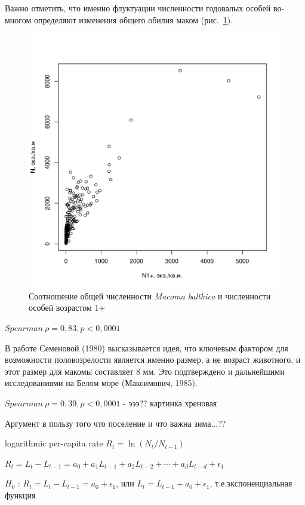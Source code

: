 Важно отметить, что именно флуктуации численности годовалых особей во-многом определяют изменения общего обилия маком (рис.~\ref{ris:N1year_vs_Nall}).
    \begin{figure}[hbp]
        \includegraphics[width=\textwidth]{../White_Sea/oneyear_all_Kandalaksha_all/N1y_vs_N2_1.pdf}
    \caption{Соотношение общей численности {\it Macoma balthica} и численности особей возрастом 1+}
    \label{ris:N1year_vs_Nall}
    \end{figure}

$Spearman\ \rho = 0,83, p < 0,0001$

В работе Семеновой (1980) высказывается идея, что ключевым фактором для возможности половозрелости является именно размер, а не возраст животного, и этот размер для макомы составляет 8 мм. Это подтверждено и дальнейшими исследованиями на Белом море (Максимович, 1985).

$Spearman\ \rho = 0,39, p < 0,0001$ - эээ?? картинка хреновая

Аргумент в пользу того что поселение и что важна зима...??
% 

logarithmic per-capita rate $R_{t} = \ln( N_{t}/N_{t-1})$ 

$R_{t}=L_{t}-L_{t-1}=a_{0} + a_{1}L_{t-1} + a_{2}L_{t-2} + \cdots + a_{d} L_{t-d} + \epsilon_{1}$

$H_{0}$ : $R_{t}=L_{t}-L_{t-1}=a_{0} + \epsilon_{1}$, или  $L_{t} = L_{t-1} + a_{0} + \epsilon_{1}$, т.е.экспоненциальная функция




